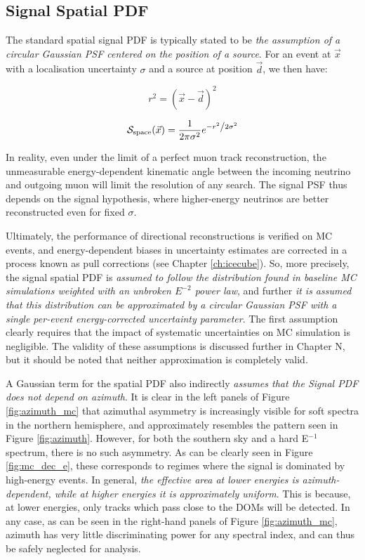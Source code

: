 \subsection*{Signal Spatial PDF}

The standard spatial signal PDF is typically stated to be \emph{the assumption of a circular Gaussian PSF centered on the position of a source}. For an event at $\vec{x}$ with a localisation uncertainty $\sigma$ and a source at position $\vec{d}$, we then have:

\begin{equation}
r^{2} =  (\vec{x}- \vec{d})^{2}
\end{equation}

\begin{equation}
\mathcal{S}_{\textup{space}} (\vec{x}) = \frac{1}{{2\pi\sigma^{2} }}e^{{{ - r^{2}  } \mathord{\left/ {\vphantom {{ - \left( {x - \mu } \right)^2 } {2\sigma ^2 }}} \right. \kern-\nulldelimiterspace} {2\sigma ^2 }}}
\end{equation}

In reality, even under the limit of a perfect muon track reconstruction, the unmeasurable energy-dependent kinematic angle between the incoming neutrino and outgoing muon will limit the resolution of any search. The signal PSF thus depends on the signal hypothesis, where higher-energy neutrinos are better reconstructed even for fixed $\sigma$. 

Ultimately, the performance of directional reconstructions is verified on MC events, and energy-dependent biases in uncertainty estimates are corrected in a process known as pull corrections (see Chapter \ref{ch:icecube}). So, more precisely, the signal spatial PDF is \emph{assumed to follow the distribution found in baseline MC simulations weighted with an unbroken $E^{-2}$ power law}, and further \emph{it is assumed that this distribution can be approximated by a circular Gaussian PSF with a single per-event energy-corrected uncertainty parameter}. The first assumption clearly requires that the impact of systematic uncertainties on MC simulation is negligible. The validity of these assumptions is discussed further in Chapter N, but it should be noted that neither approximation is completely valid. 

A Gaussian term for the spatial PDF also indirectly \emph{assumes that the Signal PDF does not depend on azimuth}. It is clear in the left panels of Figure \ref{fig:azimuth_mc} that azimuthal asymmetry is increasingly visible for soft spectra in the northern hemisphere, and approximately  resembles the pattern seen in Figure \ref{fig:azimuth}. However, for both the southern sky and a hard E$^{-1}$ spectrum, there is no such asymmetry. As can be clearly seen in Figure \ref{fig:mc_dec_e}, these corresponds to regimes where the signal is dominated by high-energy events. In general, \emph{the effective area at lower energies is azimuth-dependent, while at higher energies it is approximately uniform}. This is because, at lower energies, only tracks which pass close to the DOMs will be detected. In any case, as can be seen in the right-hand panels of Figure \ref{fig:azimuth_mc}, azimuth has very little discriminating power for any spectral index, and can thus be safely neglected for analysis.

